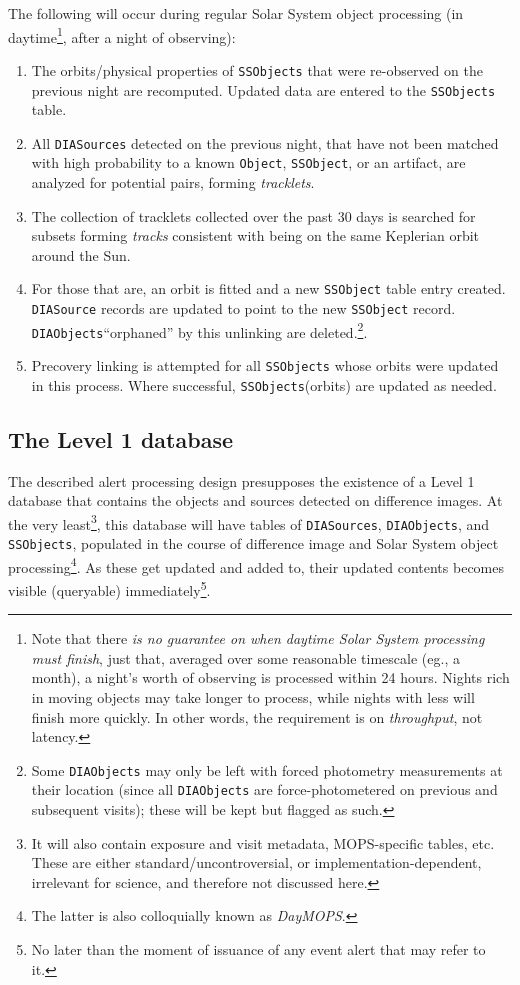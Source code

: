 \documentclass[12pt]{article}
\newcommand{\code}[1]{\texttt{#1}}
\newcommand{\DIASource}{\code{DIASource}\xspace}
\newcommand{\DIASources}{\code{DIASources}\xspace}
\newcommand{\DIAObjects}{\code{DIAObjects}\xspace}
\newcommand{\DB}{{Level 1 database}\xspace}
\newcommand{\Object}{\code{Object}\xspace}
\newcommand{\SSObject}{\code{SSObject}\xspace}
\newcommand{\SSObjects}{\code{SSObjects}\xspace}
\begin{document}
The following will occur during regular Solar System object processing (in daytime\footnote{Note that there {\em is no guarantee on when daytime Solar System processing must finish}, just that, averaged over some reasonable timescale (eg., a month), a night's worth of observing is processed within 24 hours. Nights rich in moving objects may take longer to process, while nights with less will finish more quickly. In other words, the requirement is on {\em throughput}, not latency.}, after a night of observing):
\begin{enumerate}
\item The orbits/physical properties of \SSObjects that were re-observed on the previous night are recomputed. Updated data are entered to the \SSObjects table.
\item All \DIASources detected on the previous night, that have not been matched with high probability to a known \Object, \SSObject, or an artifact, are analyzed for potential pairs, forming {\em tracklets}.
\item The collection of tracklets collected over the past 30 days is searched for subsets forming {\em tracks} consistent with being on the same Keplerian orbit around the Sun.
\item For those that are, an orbit is fitted and a new \SSObject table entry created. \DIASource records are updated to point to the new \SSObject record. \DIAObjects ``orphaned'' by this unlinking are deleted.\footnote{Some \DIAObjects may only be left with forced photometry measurements at their location (since all \DIAObjects are force-photometered on previous and subsequent visits);  these will be kept but flagged as such.}.
\item Precovery linking is attempted for all \SSObjects whose orbits were updated in this process. Where successful, \SSObjects (orbits) are updated as needed.
\end{enumerate}

\subsection{The \DB}
\label{sec:level1db}

The described alert processing design presupposes the existence of a \DB that contains the objects and sources detected on difference images. At the very least\footnote{It will also contain exposure and visit metadata, MOPS-specific tables, etc. These are either standard/uncontroversial, or implementation-dependent, irrelevant for science, and therefore not discussed here.}, this database will have tables of \DIASources, \DIAObjects, and \SSObjects, populated in the course of difference image and Solar System object processing\footnote{The latter is also colloquially known as {\em DayMOPS}.}. As these get updated and added to, their updated contents becomes visible (queryable) immediately\footnote{No later than the moment of issuance of any event alert that may refer to it.}.
\end{document}
